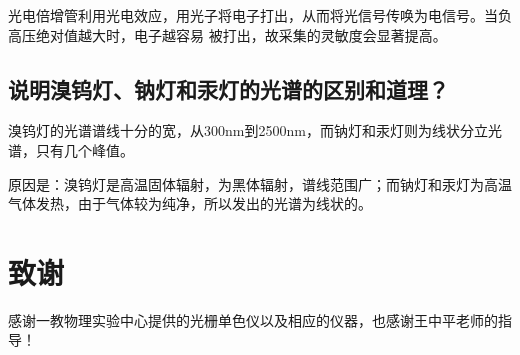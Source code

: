 \documentclass[a4paper,UTF8]{ctexart}
\begin{document}
光电倍增管利用光电效应，用光子将电子打出，从而将光信号传唤为电信号。当负高压绝对值越大时，电子越容易
被打出，故采集的灵敏度会显著提高。

\subsection{说明溴钨灯、钠灯和汞灯的光谱的区别和道理？}

溴钨灯的光谱谱线十分的宽，从300nm到2500nm，而钠灯和汞灯则为线状分立光谱，只有几个峰值。

原因是：溴钨灯是高温固体辐射，为黑体辐射，谱线范围广；而钠灯和汞灯为高温气体发热，由于气体较为纯净，所以发出的光谱为线状的。

\section{致谢}

感谢一教物理实验中心提供的光栅单色仪以及相应的仪器，也感谢王中平老师的指导！




\end{document}
